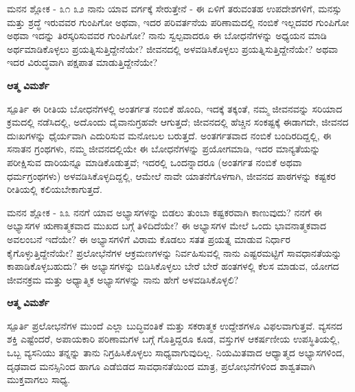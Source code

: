 \begin{mananam}{\mananamfont \large ಮನನ ಶ್ಲೋಕ - ೩೧ ೩೨}
\mananamtext ನಾನು ಯಾವ ವರ್ಗಕ್ಕೆ ಸೇರುತ್ತೇನೆ -  ಈ ಏಳಿಗೆ ತರುವಂತಹ ಉಪದೇಶಗಳಿಗೆ, ಮನಸ್ಸು ಮತ್ತು ಶ್ರದ್ಧೆ ಇರುವವರ ಗುಂಪಿಗೋ ಅಥವಾ, ಇದರ ಪರಿವರ್ತನೆಯ ಪರಿಣಾಮದಲ್ಲಿ ನಂಬಿಕೆ ಇಲ್ಲದವರ ಗುಂಪಿಗೋ ಅಥವಾ ಇದನ್ನು ತಿರಸ್ಕರಿಸುವವರ ಗುಂಪಿಗೋ? ನಾನು ಸ್ವಲ್ಪವಾದರೂ ಈ ಬೋಧನೆಗಳನ್ನು ಅಧ್ಯಯನ ಮಾಡಿ ಅರ್ಥಮಾಡಿಕೊಳ್ಳಲು ಪ್ರಯತ್ನಿಸುತ್ತಿದ್ದೇನೆಯೇ? ಜೀವನದಲ್ಲಿ ಅಳವಡಿಸಿಕೊಳ್ಳಲು ಪ್ರಯತ್ನಿಸುತ್ತಿದ್ದೇನೆಯೇ? ಅಥವಾ ಇದರ ವಿರುದ್ಧವಾಗಿ ಪಕ್ಷಪಾತ ಮಾಡುತ್ತಿದ್ದೇನೆಯೇ?
\end{mananam}
\WritingHand\enspace\textbf{ಆತ್ಮ ವಿಮರ್ಶೆ}\\
\begin{inspiration}{\mananamfont \large ಸ್ಪೂರ್ತಿ}
\ssmall \mananamtext ಈ ರೀತಿಯ ಬೋಧನೆಗಳಲ್ಲಿ ಅಂತರ್ಗತ ನಂಬಿಕೆ ಹೊಂದಿ, ಇದಕ್ಕೆ ತಕ್ಕಂತೆ, ನಮ್ಮ ಜೀವನವನ್ನು ಸರಿಯಾದ ಕ್ರಮದಲ್ಲಿ ನಡೆಸಿದಲ್ಲಿ, ಅದೊಂದು ದೈವಾನುಗ್ರಹವೇ ಆಗುತ್ತದೆ; ಜೀವನದಲ್ಲಿ ಹೆಚ್ಚಿನ  ಸಂಕಷ್ಟಕ್ಕೆ ಈಡಾಗದೇ, ಜೀವನದ ದುಃಖಗಳನ್ನು ಧೈರ್ಯವಾಗಿ ಎದುರಿಸುವ ಮನೋಬಲ ಬರುತ್ತದೆ.  ಅಂತರ್ಗತವಾದ ನಂಬಿಕೆ ಬಂದಿರದಿದ್ದಲ್ಲಿ, ಈ ಸನಾತನ ಗ್ರಂಥಗಳು, ನಮ್ಮ ಜೀವನದಲ್ಲಿಯೇ ಈ ಬೋಧನೆಗಳನ್ನು ಪ್ರಯೋಗಮಾಡಿ, ಇದರ ಮಾನ್ಯತೆಯನ್ನು ಪರೀಕ್ಷಿಸುವ ದಾರಿಯನ್ನೂ ಮಾಡಿಕೊಡುತ್ತವೆ; ಇದರಲ್ಲಿ ಒಂದನ್ನಾದರೂ (ಅಂತರ್ಗತ ನಂಬಿಕೆ ಅಥವಾ ಧರ್ಮಗ್ರಂಥಗಳು) ಅಳವಡಿಸಿಕೊಳ್ಳದಿದ್ದಲ್ಲಿ, ಆಮೇಲೆ ನಾವೇ ಯಾತನೆಗೊಳಗಾಗಿ, ಜೀವನದ ಪಾಠಗಳನ್ನು ಕಷ್ಟಕರ ರೀತಿಯಲ್ಲಿ ಕಲಿಯಬೇಕಾಗುತ್ತದೆ. 
\end{inspiration}
\newpage

\begin{mananam}{\mananamfont \large ಮನನ ಶ್ಲೋಕ - ೩೩}
\mananamtext ನನಗೆ ಯಾವ ಅಭ್ಯಾಸಗಳನ್ನು ಬಿಡಲು ತುಂಬಾ ಕಷ್ಟಕರವಾಗಿ ಕಾಣುವುದು? ನನಗೆ ಈ ಅಭ್ಯಾಸಗಳ ಋಣಾತ್ಮಕವಾದ ಮುಖದ ಬಗ್ಗೆ ತಿಳಿದಿದೆಯೇ? ಈ ಅಭ್ಯಾಸಗಳ ಮೇಲೆ ಒಂದು ಭಾವನಾತ್ಮಕವಾದ ಅವಲಂಬನೆ ಇದೆಯೇ? ಈ ಅಭ್ಯಾಸಗಳಿಗೆ ವಿರಾಮ ಕೊಡಲು ಸತತ ಪ್ರಯತ್ನ ಮಾಡುವ ನಿರ್ಧಾರ ಕೈಗೊಳ್ಳುತ್ತಿದ್ದೇನೆಯೇ? ಪ್ರಲೋಭೆನೆಗಳ ಆಕ್ರಮಣಗಳನ್ನು ನಿರ್ವಹಿಸುವಲ್ಲಿ ನಾನು ಎಷ್ಟರಮಟ್ಟಿಗೆ ಸಾವಧಾನತೆಯನ್ನು ಕಾಪಾಡಿಕೊಳ್ಳಬಹುದು? ಈ ಅಭ್ಯಾಸಗಳನ್ನು ಬಿಡಿಸಿಕೊಳ್ಳಲು ಬೇರೆ ಬೇರೆ ಹಂತಗಳಲ್ಲಿ ಕೆಲಸ ಮಾಡುವ, ಯೋಗದ ಜೀವನಕ್ರಮ ಮತ್ತು ಅಧ್ಯಾತ್ಮಿಕ ಅಭ್ಯಾಸಗಳನ್ನು ನಾನು ಹೇಗೆ ಅಳವಡಿಸಿಕೊಳ್ಳಲಿ?
\end{mananam}
\WritingHand\enspace\textbf{ಆತ್ಮ ವಿಮರ್ಶೆ}\\
\begin{inspiration}{\mananamfont \large ಸ್ಪೂರ್ತಿ}
\mananamtext ಪ್ರಲೋಭನೆಗಳ ಮುಂದೆ ಎಲ್ಲಾ ಬುದ್ಧಿವಂತಿಕೆ ಮತ್ತು ಸಕರಾತ್ಮಕ ಉದ್ದೇಶಗಳೂ ವಿಫಲವಾಗುತ್ತವೆ. ವ್ಯಸನದ ಶಕ್ತಿ ಎಷ್ಟೆಂದರೆ, ಅಪಾಯಕಾರಿ ಪರಿಣಾಮಗಳ ಬಗ್ಗೆ ಗೊತ್ತಿದ್ದರೂ ಕೂಡ, ವಸ್ತುಗಳ ಆಕರ್ಷಣೀಯ ಉಪಸ್ಥಿತಿಯಲ್ಲಿ, ಒಬ್ಬ ವ್ಯಸನಿಯು ತನ್ನನ್ನು ತಾನು ನಿಗ್ರಹಿಸಿಕೊಳ್ಳಲು ಸಾಧ್ಯವಾಗುವುದಿಲ್ಲ. ನಿಯಮಿತವಾದ ಆಧ್ಯಾತ್ಮದ ಅಭ್ಯಾಸಗಳಿಂದ, ದೃಢವಾದ ಮನಸ್ಸಿನಿಂದ ಹಾಗೂ ಎಡೆಬಿಡದ ಸಾವಧಾನತೆಯಿಂದ ಮಾತ್ರ, ಪ್ರಲೋಭನೆಗಳಿಂದ ಶಾಶ್ವತವಾಗಿ ಮುಕ್ತವಾಗಲು ಸಾಧ್ಯ.
\end{inspiration}
\newpage

